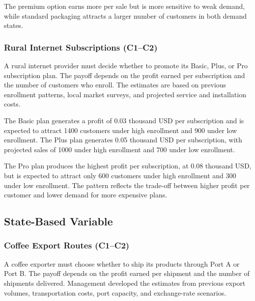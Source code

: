 	The premium option earns more per sale but is more sensitive to weak demand, while standard packaging attracts a larger number of customers in both demand states.
	
	\subsubsection{Rural Internet Subscriptions (C1--C2)}
	\label{sec:problem7-rural-internet-subscriptions-c1-c2}
	
	A rural internet provider must decide whether to promote its Basic, Plus, or Pro subscription plan. The payoff depends on the profit earned per subscription and the number of customers who enroll. The estimates are based on previous enrollment patterns, local market surveys, and projected service and installation costs.
	
	The Basic plan generates a profit of 0.03 thousand USD per subscription and is expected to attract 1400 customers under high enrollment and 900 under low enrollment. The Plus plan generates 0.05 thousand USD per subscription, with projected sales of 1000 under high enrollment and 700 under low enrollment.
	
	The Pro plan produces the highest profit per subscription, at 0.08 thousand USD, but is expected to attract only 600 customers under high enrollment and 300 under low enrollment. The pattern reflects the trade-off between higher profit per customer and lower demand for more expensive plans.

	
	\subsection{State-Based Variable}
	\label{sec:state-based-variable-payoff-profit-per-item-times-number-of-items}


	\subsubsection{Coffee Export Routes (C1--C2)}
	\label{sec:problem8-coffee-export-routes-c1-c2}
	
	A coffee exporter must choose whether to ship its products through Port A or Port B. The payoff depends on the profit earned per shipment and the number of shipments delivered. Management developed the estimates from previous export volumes, transportation costs, port capacity, and exchange-rate scenarios.
	
